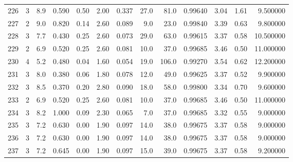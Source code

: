 \begin{tabular}{lrrrrrrrrrrrr}
226  &        3 &            8.9 &             0.590 &         0.50 &            2.00 &      0.337 &                 27.0 &                  81.0 &  0.99640 &  3.04 &       1.61 &   9.500000 \\
227  &        2 &            9.0 &             0.820 &         0.14 &            2.60 &      0.089 &                  9.0 &                  23.0 &  0.99840 &  3.39 &       0.63 &   9.800000 \\
228  &        3 &            7.7 &             0.430 &         0.25 &            2.60 &      0.073 &                 29.0 &                  63.0 &  0.99615 &  3.37 &       0.58 &  10.500000 \\
229  &        2 &            6.9 &             0.520 &         0.25 &            2.60 &      0.081 &                 10.0 &                  37.0 &  0.99685 &  3.46 &       0.50 &  11.000000 \\
230  &        4 &            5.2 &             0.480 &         0.04 &            1.60 &      0.054 &                 19.0 &                 106.0 &  0.99270 &  3.54 &       0.62 &  12.200000 \\
231  &        3 &            8.0 &             0.380 &         0.06 &            1.80 &      0.078 &                 12.0 &                  49.0 &  0.99625 &  3.37 &       0.52 &   9.900000 \\
232  &        3 &            8.5 &             0.370 &         0.20 &            2.80 &      0.090 &                 18.0 &                  58.0 &  0.99800 &  3.34 &       0.70 &   9.600000 \\
233  &        2 &            6.9 &             0.520 &         0.25 &            2.60 &      0.081 &                 10.0 &                  37.0 &  0.99685 &  3.46 &       0.50 &  11.000000 \\
234  &        3 &            8.2 &             1.000 &         0.09 &            2.30 &      0.065 &                  7.0 &                  37.0 &  0.99685 &  3.32 &       0.55 &   9.000000 \\
235  &        3 &            7.2 &             0.630 &         0.00 &            1.90 &      0.097 &                 14.0 &                  38.0 &  0.99675 &  3.37 &       0.58 &   9.000000 \\
236  &        3 &            7.2 &             0.630 &         0.00 &            1.90 &      0.097 &                 14.0 &                  38.0 &  0.99675 &  3.37 &       0.58 &   9.000000 \\
237  &        3 &            7.2 &             0.645 &         0.00 &            1.90 &      0.097 &                 15.0 &                  39.0 &  0.99675 &  3.37 &       0.58 &   9.200000 \\

\end{tabular}
